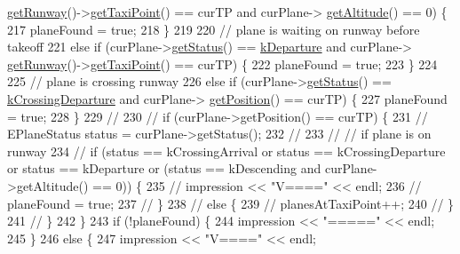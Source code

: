 \begin{DoxyCode}
      \hyperlink{classAirplane_ab6dda72f7cfd29a7334e0494d184bbfa}{getRunway}()->\hyperlink{classRunway_ad2d8fd5696ec93e2fa3d32bec3d02f59}{getTaxiPoint}() == curTP and curPlane->
      \hyperlink{classAirplane_ad2550909ab563f7df850f79f23c3a308}{getAltitude}() == 0) \{
217                 planeFound = \textcolor{keyword}{true};
218             \}
219 
220             \textcolor{comment}{// plane is waiting on runway before takeoff}
221             \textcolor{keywordflow}{else} \textcolor{keywordflow}{if} (curPlane->\hyperlink{classAirplane_a40bbb3024a476115700977c60bae2705}{getStatus}() == \hyperlink{Airplane_8h_a0e5bbf7c6c727baaba49062300fae19fae2255e82c6ed427f0820a47f2e5f5ac9}{kDeparture} and curPlane->
      \hyperlink{classAirplane_ab6dda72f7cfd29a7334e0494d184bbfa}{getRunway}()->\hyperlink{classRunway_ad2d8fd5696ec93e2fa3d32bec3d02f59}{getTaxiPoint}() == curTP) \{
222                 planeFound = \textcolor{keyword}{true};
223             \}
224 
225             \textcolor{comment}{// plane is crossing runway}
226             \textcolor{keywordflow}{else} \textcolor{keywordflow}{if} (curPlane->\hyperlink{classAirplane_a40bbb3024a476115700977c60bae2705}{getStatus}() == \hyperlink{Airplane_8h_a0e5bbf7c6c727baaba49062300fae19fa53315b4aeb1d32cbe1f8b8aacd283f2d}{kCrossingDeparture} and curPlane->
      \hyperlink{classAirplane_ab4fa66c0adb05725a51524265f8c520c}{getPosition}() == curTP) \{
227                 planeFound = \textcolor{keyword}{true};
228             \}
229 \textcolor{comment}{//}
230 \textcolor{comment}{//            if (curPlane->getPosition() == curTP) \{}
231 \textcolor{comment}{//                EPlaneStatus status = curPlane->getStatus();}
232 \textcolor{comment}{//}
233 \textcolor{comment}{//                // if plane is on runway}
234 \textcolor{comment}{//                if (status == kCrossingArrival or status == kCrossingDeparture or status == kDeparture or
       (status == kDescending and curPlane->getAltitude() == 0)) \{}
235 \textcolor{comment}{//                    impression << "V====" << endl;}
236 \textcolor{comment}{//                    planeFound = true;}
237 \textcolor{comment}{//                \}}
238 \textcolor{comment}{//                else \{}
239 \textcolor{comment}{//                    planesAtTaxiPoint++;}
240 \textcolor{comment}{//                \}}
241 \textcolor{comment}{//            \}}
242         \}
243         \textcolor{keywordflow}{if} (!planeFound) \{
244             impression << \textcolor{stringliteral}{"====="} << endl;
245         \}
246         \textcolor{keywordflow}{else} \{
247             impression << \textcolor{stringliteral}{"V===="} << endl;

\end{DoxyCode}
